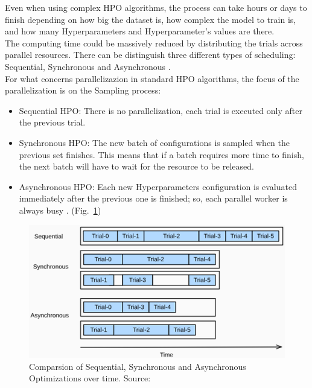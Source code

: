 Even when using complex HPO algorithms, the process can take hours or days to finish depending on how big the dataset is, how complex the model to train is, and how many Hyperparameters and Hyperparameter's values are there.
\\[0.3cm]The computing time could be massively reduced by distributing the trials across parallel resources. There can be distinguish three different types of scheduling: Sequential, Synchronous and Asynchronous \cite{Tesi-1.6}.
\\[0.3cm]For what concerns parallelizazion in standard HPO algorithms, the focus of the parallelization is on the Sampling process:
\begin{itemize}[itemsep=0.1cm]
	\item Sequential HPO: There is no parallelization, each trial is executed only after the previous trial.
	\item Synchronous HPO: The new batch of configurations is sampled when the previous set finishes. This means that if a batch requires more time to finish, the next batch will have to wait for the resource to be released.
	\item Asynchronous HPO: Each new Hyperparameters configuration is evaluated immediately after the previous one is finished; so, each parallel worker is always busy \cite{Tesi-1.6}. (Fig.~\ref{fig:figure-2.4.1})
\end{itemize}
\begin{figure}[t]
	\centering
	\includegraphics[width=12cm]{figures/figure-2.4.1.png}
	\caption[Comparsion of Sequential, Synchronous and Asynchronous Optimizations]{Comparsion of Sequential, Synchronous and Asynchronous Optimizations over time. Source:~\cite{Tesi-1.6}}
	\label{fig:figure-2.4.1}
\end{figure}
